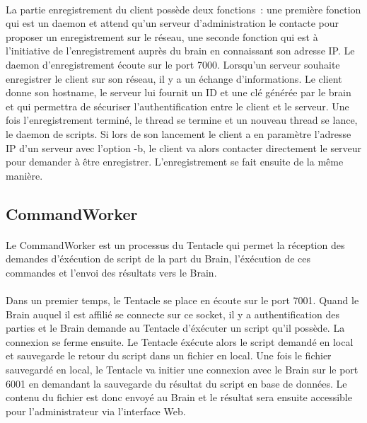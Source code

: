 \paragraph{}
La partie enregistrement du client possède deux fonctions : une première fonction qui est un daemon et attend qu'un serveur d'administration le contacte pour proposer un enregistrement sur le réseau, une seconde fonction qui est à l'initiative de l'enregistrement auprès du brain en connaissant son adresse IP. 
Le daemon d'enregistrement écoute sur le port 7000. Lorsqu'un serveur souhaite enregistrer le client sur son réseau, il y a un échange d'informations. Le client donne son hostname, le serveur lui fournit  un ID et une clé générée par le brain et qui permettra de sécuriser l'authentification entre le client et le serveur. Une fois l'enregistrement terminé, le thread se termine et un nouveau thread se lance, le daemon de scripts.
Si lors de son lancement le client a en paramètre l'adresse IP d'un serveur avec l'option -b, le client va alors contacter directement le serveur pour demander à être enregistrer. L'enregistrement se fait ensuite de la même manière.

\subsection{CommandWorker}
\paragraph{}
Le CommandWorker est un processus du Tentacle qui permet la réception des demandes d'éxécution de script de la part du Brain, l'éxécution de ces commandes et l'envoi des résultats vers le Brain.
\paragraph{}
Dans un premier temps, le Tentacle se place en écoute sur le port 7001. Quand le Brain auquel il est affilié se connecte sur ce socket, il y a authentification des parties et le Brain demande au Tentacle d'éxécuter un script qu'il possède. 
La connexion se ferme ensuite. Le Tentacle éxécute alors le script demandé en local et sauvegarde le retour du script dans un fichier en local. 
Une fois le fichier sauvegardé en local, le Tentacle va initier une connexion avec le Brain sur le port 6001 en demandant la sauvegarde du résultat du script en base de données.
Le contenu du fichier est donc envoyé au Brain et le résultat sera ensuite accessible pour l'administrateur via l'interface Web.